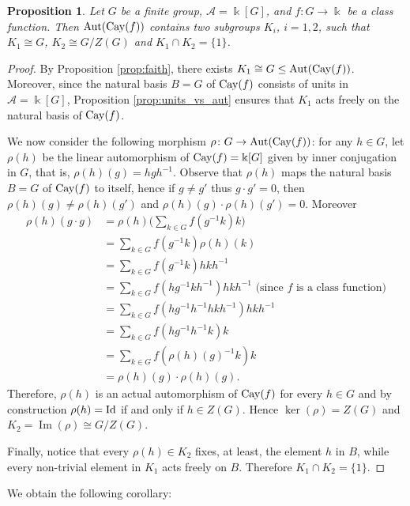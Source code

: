 \documentclass[a4paper,12pt]{amsart}
\newtheorem{proposition}[theorem]{Proposition}
\theoremstyle{definition}
\theoremstyle{remark}
\renewcommand{\Im}{\operatorname{Im}}
\newcommand{\Aut}{\operatorname{Aut}}
\newcommand{\Cay}{{\rm Cay}}
\newcommand{\A}{\mathcal{A}}
\begin{document}
\begin{proposition}\label{prop:class_function}
Let  $G$ be a finite group, $\A=\Bbbk[G]$, and $f\colon G\to \Bbbk$ be a class function. Then $\Aut(\Cay(f))$ contains two subgroups $K_i$, $i=1,2$, such that $K_1\cong G$, $K_2\cong G/Z(G)$ and $K_1\cap K_2=\{1\}$.
\end{proposition}
\begin{proof}
By Proposition \ref{prop:faith},  there exists $K_1\cong G\leq \Aut(\Cay(f))$. Moreover, since the natural basis $B=G$ of $\Cay(f)$ consists of units in $\A=\Bbbk[G]$, Proposition \ref{prop:units_vs_aut} ensures that $K_1$ acts freely on the natural basis of $\Cay(f)$.

We now consider the following morphism $\rho\colon G\to \Aut(\Cay(f))$: for any $h\in G$, let $\rho(h)$ be the linear automorphism of $\Cay(f)=\Bbbk[G]$ given by inner conjugation in $G$, that is, $\rho(h)(g)=hgh^{-1}$. 
Observe that $\rho(h)$ maps the natural basis $B=G$ of $\Cay(f)$ to itself, hence if $g \neq g'$ thus $g\cdot g'=0$, then  $\rho(h)(g) \neq \rho(h)(g')$ and  $\rho(h)(g)\cdot\rho(h)(g')=0$. Moreover
\begin{equation*}
\begin{split}
\rho(h)(g\cdot g) &=\rho(h)\Big(\sum_{k\in G}f(g^{-1}k)k\Big)\\
& =\sum_{k\in G}f(g^{-1}k)\rho(h)(k)\\
& =\sum_{k\in G}f(g^{-1}k) hkh^{-1}\\
& =\sum_{k\in G}f(hg^{-1}kh^{-1}) hkh^{-1}\text{ (since $f$ is a class function)}\\ 
& =\sum_{k\in G}f(hg^{-1}h^{-1}hkh^{-1}) hkh^{-1}\\ 
& =\sum_{k\in G}f(hg^{-1}h^{-1}k) k\\
& =\sum_{k\in G}f(\rho(h)(g)^{-1}k) k\\
& = \rho(h)(g)\cdot\rho(h)(g).
\end{split}
\end{equation*}
Therefore, $\rho(h)$ is an actual automorphism of $\Cay(f)$ for every $h\in G$ and by construction $\rho(h)=\rm{Id}$ if and only if $h\in Z(G)$. Hence $\ker(\rho)=Z(G)$ and $K_2=\Im(\rho)\cong G/Z(G)$.

Finally, notice that every $\rho(h)\in K_2$ fixes, at least, the element $h$ in $B$, while every non-trivial element in $K_1$  acts freely on $B$. Therefore  $K_1\cap K_2=\{1\}$.
\end{proof}

We obtain the following corollary:
\end{document}
